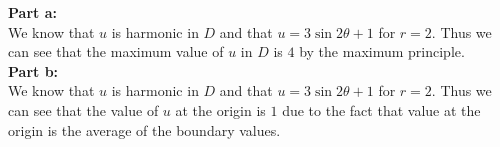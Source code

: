 \documentclass[answers,12pt,addpoints]{exam}
\begin{document}
\begin{questions}
    \begin{solution}
        \textbf{Part a:} \\
        We know that \( u \) is harmonic in \( D \) and that \( u = 3 \sin 2\theta + 1 \) for \( r = 2 \). Thus we can see that the maximum value of \( u \) in \( D \) is \( 4 \) by the maximum principle.\\
        \textbf{Part b:} \\
        We know that \( u \) is harmonic in \( D \) and that \( u = 3 \sin 2\theta + 1 \) for \( r = 2 \). Thus we can see that the value of \( u \) at the origin is \( 1 \) due to the fact that value at the origin is the average of the boundary values.\\
    \end{solution}
    


\end{questions}
\end{document}
